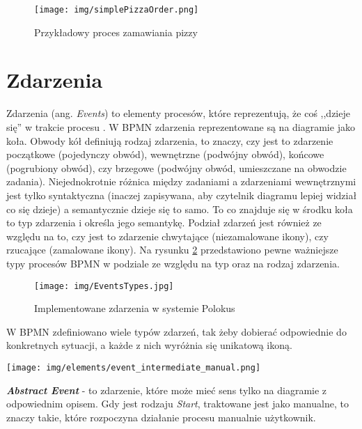 \documentclass[declaration,shortabstract,mgr]{iithesis}
\newcommand{\bpmn}{BPMN }
\begin{document}
\begin{figure}[H]
    \texttt{[image: img/simplePizzaOrder.png]}
    \caption{Przykładowy proces zamawiania pizzy}
    \label{fig:tasks-example}
\end{figure}


\section{Zdarzenia}

Zdarzenia (ang. \textit{Events}) to elementy procesów, które reprezentują, że coś ,,dzieje się'' w trakcie procesu \cite{bruce-silver-bpmn-events}. W \bpmn zdarzenia reprezentowane są na diagramie jako koła. Obwody kół definiują rodzaj zdarzenia, to znaczy, czy jest to zdarzenie początkowe (pojedynczy obwód), wewnętrzne (podwójny obwód), końcowe (pogrubiony obwód), czy brzegowe (podwójny obwód, umieszczane na obwodzie zadania). Niejednokrotnie różnica między zadaniami a zdarzeniami wewnętrznymi jest tylko syntaktyczna (inaczej zapisywana, aby czytelnik diagramu lepiej widział co się dzieje) a semantycznie dzieje się to samo. To co znajduje się w środku koła to typ zdarzenia i określa jego semantykę. Podział zdarzeń jest również ze względu na to, czy jest to zdarzenie chwytające (niezamalowane ikony), czy rzucające (zamalowane ikony). Na rysunku \ref{fig:event-types} przedstawiono pewne ważniejsze typy procesów \bpmn w podziale ze względu na typ oraz na rodzaj zdarzenia.

\begin{figure}
    \texttt{[image: img/EventsTypes.jpg]}
    \caption{Implementowane zdarzenia w systemie Polokus}
    \label{fig:event-types}
\end{figure}

W \bpmn zdefiniowano wiele typów zdarzeń, tak żeby dobierać odpowiednie do konkretnych sytuacji, a każde z nich wyróżnia się unikatową ikoną.


\noindent\begin{minipage}[t]{0.075\textwidth}\vspace{0pt}
\texttt{[image: img/elements/event\_intermediate\_manual.png]}
\end{minipage}\hfill
\begin{minipage}[t]{0.875\textwidth}\vspace{0pt}
\textbf{\textit{Abstract Event}} - to zdarzenie, które może mieć sens tylko na diagramie z odpowiednim opisem. Gdy jest rodzaju \textit{Start}, traktowane jest jako manualne, to znaczy takie, które rozpoczyna działanie procesu manualnie użytkownik.
\end{minipage}
\end{document}
